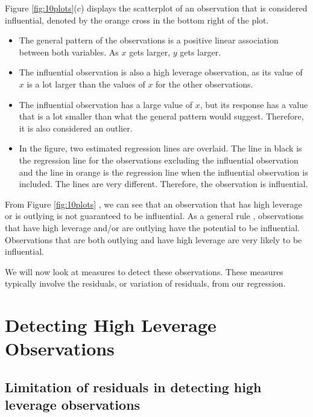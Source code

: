 \documentclass[
]{book}
\providecommand{\tightlist}{%
  \setlength{\itemsep}{0pt}\setlength{\parskip}{0pt}}
\begin{document}
Figure \ref{fig:10plots}(c) displays the scatterplot of an observation that is considered influential, denoted by the orange cross in the bottom right of the plot.

\begin{itemize}
\tightlist
\item
  The general pattern of the observations is a positive linear association between both variables. As \(x\) gets larger, \(y\) gets larger.
\item
  The influential observation is also a high leverage observation, as its value of \(x\) is a lot larger than the values of \(x\) for the other observations.
\item
  The influential observation has a large value of \(x\), but its response has a value that is a lot smaller than what the general pattern would suggest. Therefore, it is also considered an outlier.
\item
  In the figure, two estimated regression lines are overlaid. The line in black is the regression line for the observations excluding the influential observation and the line in orange is the regression line when the influential observation is included. The lines are very different. Therefore, the observation is influential.
\end{itemize}

From Figure \ref{fig:10plots} , we can see that an observation that has high leverage or is outlying is not guaranteed to be influential. As a general rule , observations that have high leverage and/or are outlying have the potential to be influential. Observations that are both outlying and have high leverage are very likely to be influential.

We will now look at measures to detect these observations. These measures typically involve the residuals, or variation of residuals, from our regression.

\hypertarget{detecting-high-leverage-observations}{%
\section{Detecting High Leverage Observations}\label{detecting-high-leverage-observations}}

\hypertarget{limitation-of-residuals-in-detecting-high-leverage-observations}{%
\subsection{Limitation of residuals in detecting high leverage observations}\label{limitation-of-residuals-in-detecting-high-leverage-observations}}
\end{document}

